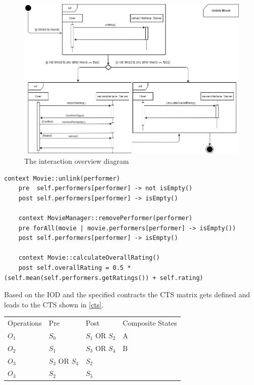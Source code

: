 \begin{figure}[h]
	\centering
	\includegraphics[width=\textwidth]{./images/iod.png}
	\caption{The interaction overview diagram}
	\label{iod}
\end{figure}

\begin{lstlisting}[caption={Contracts written in OCL},label={contracts2}]
	context Movie::unlink(performer)
	pre  self.performers[performer] -> not isEmpty()
	post self.performers[performer] -> isEmpty()
	
	context MovieManager::removePerformer(performer)
	pre forAll(movie | movie.performers[performer] -> isEmpty())
	post self.performers[performer] -> isEmpty()
	
	context Movie::calculateOverallRating()
	post self.overallRating = 0.5 * (self.mean(self.performers.getRatings()) + self.rating)
\end{lstlisting}

\newpage

Based on the IOD and the specified contracts the CTS matrix gets defined and leads to the CTS shown in \autoref{cts}.

\begin{longtable}[h]{llll}
	Operations & Pre & Post & Composite States \\
	$O_{1}$ & $S_{0}$ & $S_{1}$ OR $S_{2}$ & A \\
	$O_{2}$ & $S_{1}$ & $S_{3}$ OR $S_{4}$ & B \\
	$O_{3}$ & $S_{3}$ OR $S_{4}$ & $S_{2}$ & \\
	$O_{3}$ & $S_{2}$ & $S_{5}$ & \\
\end{longtable}

